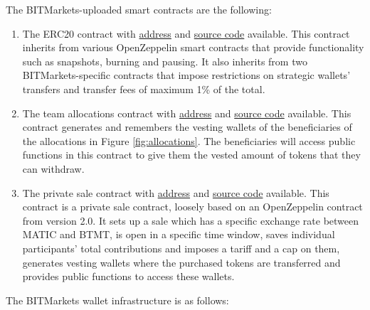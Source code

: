 \documentclass[a4paper,12pt]{article}
\begin{document}
The BITMarkets-uploaded smart contracts are the following:
\begin{enumerate}
  \item \label{contracts:token} The ERC20 contract with \href{https://mumbai.polygonscan.com/address/0x5D4f3495c35B5A6687095710Cb02154E975dd147}{address} and \href{https://github.com/UAB-BITmarkets/token/blob/master/contracts/BITMarketsToken.sol}{source code} available. This contract inherits from various OpenZeppelin smart contracts that provide functionality such as snapshots, burning and pausing. It also inherits from two BITMarkets-specific contracts that impose restrictions on strategic wallets' transfers and transfer fees of maximum 1\% of the total.

  \item \label{contracts:allocations} The team allocations contract with \href{https://mumbai.polygonscan.com/address/0x156233dcA50144cb5E3EA3fA14E20DD6fC70fB0C}{address} and \href{https://github.com/UAB-BITmarkets/token/blob/master/contracts/BITMarketsTokenAllocations.sol}{source code} available. This contract generates and remembers the vesting wallets of the beneficiaries of the allocations in Figure \ref{fig:allocations}. The beneficiaries will access public functions in this contract to give them the vested amount of tokens that they can withdraw.

  \item \label{contracts:privatesale} The private sale contract with \href{https://mumbai.polygonscan.com/address/0x82D1205305c01B5FC67a261EE63542c04D4d521d}{address} and \href{https://github.com/UAB-BITmarkets/token/blob/master/contracts/BITMarketsTokenPrivateSale.sol}{source code} available.
  This contract is a private sale contract, loosely based on an OpenZeppelin contract from version 2.0. It sets up a sale which has a specific exchange rate between MATIC and BTMT, is open in a specific time window, saves individual participants' total contributions and imposes a tariff and a cap on them, generates vesting wallets where the purchased tokens are transferred and provides public functions to access these wallets.

\end{enumerate}
The BITMarkets wallet infrastructure is as follows:
\end{document}
